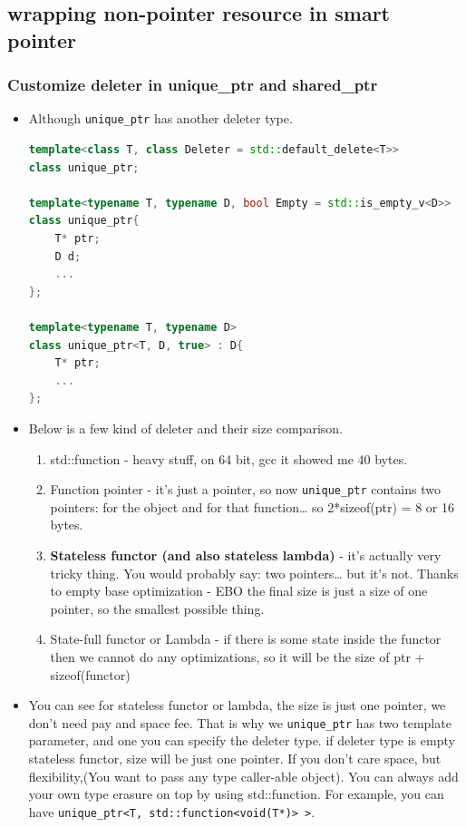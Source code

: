 \documentclass[a4paper,11pt,twoside]{book}
\begin{document}
\subsection{wrapping non-pointer resource in smart pointer}

\subsubsection{Customize deleter in unique\_ptr and shared\_ptr}

\begin{itemize}
	    \item Although \texttt{unique\_ptr} has another deleter type. 
\begin{lstlisting}[frame=single, language=c++, mathescape=true]
template<class T, class Deleter = std::default_delete<T>> 
class unique_ptr;

template<typename T, typename D, bool Empty = std::is_empty_v<D>>
class unique_ptr{
	T* ptr;
	D d;
	...
};

template<typename T, typename D>
class unique_ptr<T, D, true> : D{
	T* ptr;
	...
};	
\end{lstlisting}	
	

	\item Below is a few kind of deleter and their size comparison.
	\begin{enumerate}
		\item std::function - heavy stuff, on 64 bit, gcc it showed me 40 bytes.
		
		\item Function pointer - it’s just a pointer, so now \texttt{unique\_ptr} contains two pointers: for the object and for that function… so 2*sizeof(ptr) = 8 or 16 bytes.
		
		\item \textbf{Stateless functor (and also stateless lambda)} - it’s actually very tricky thing. You would probably say: two pointers… but it’s not. Thanks to empty base optimization - EBO the final size is just a size of one pointer, so the smallest possible thing.
		
		\item State-full functor or Lambda - if there is some state inside the functor then we cannot do any optimizations, so it will be the size of ptr + sizeof(functor)
	\end{enumerate}

	\item You can see for stateless functor or lambda, the size is just one pointer, we don't need pay and space fee. That is why we \texttt{unique\_ptr} has two template parameter, and one you can specify the deleter type. if deleter type is empty stateless functor, size will be just one pointer. If you don't care space, but flexibility,(You want to pass any type caller-able object).  You can always add your own type erasure on top by using std::function. For example, you can have \texttt{unique\_ptr<T, std::function<void(T*)> >}.
	

\end{itemize}
\end{document}
